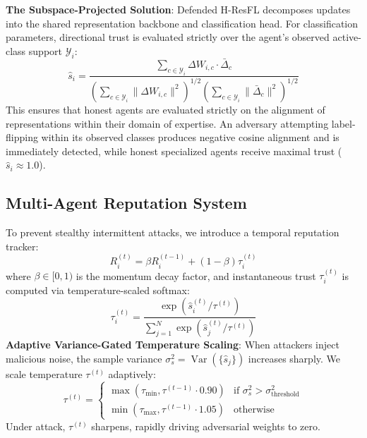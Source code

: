 \documentclass[sigconf]{acmart}
\begin{document}
\textbf{The Subspace-Projected Solution}: Defended H-ResFL decomposes updates into the shared representation backbone and classification head. For classification parameters, directional trust is evaluated strictly over the agent's observed active-class support $\mathcal{Y}_i$:
\begin{equation}
\label{eq:skew_calibrated_cosine}
\hat{s}_i = \frac{\sum_{c \in \mathcal{Y}_i} \Delta W_{i, c} \cdot \bar{\Delta}_c}{\left( \sum_{c \in \mathcal{Y}_i} \|\Delta W_{i, c}\|^2 \right)^{1/2} \left( \sum_{c \in \mathcal{Y}_i} \|\bar{\Delta}_c\|^2 \right)^{1/2}}
\end{equation}
This ensures that honest agents are evaluated strictly on the alignment of representations within their domain of expertise. An adversary attempting label-flipping within its observed classes produces negative cosine alignment and is immediately detected, while honest specialized agents receive maximal trust ($\hat{s}_i \approx 1.0$).

\subsection{Multi-Agent Reputation System}
To prevent stealthy intermittent attacks, we introduce a temporal reputation tracker:
\begin{equation}
\label{eq:reputation_update}
R_i^{(t)} = \beta R_i^{(t-1)} + (1 - \beta) \tau_i^{(t)}
\end{equation}
where $\beta \in [0, 1)$ is the momentum decay factor, and instantaneous trust $\tau_i^{(t)}$ is computed via temperature-scaled softmax:
\begin{equation}
\tau_i^{(t)} = \frac{\exp(\hat{s}_i^{(t)} / \tau^{(t)})}{\sum_{j=1}^N \exp(\hat{s}_j^{(t)} / \tau^{(t)})}
\end{equation}
\textbf{Adaptive Variance-Gated Temperature Scaling}: When attackers inject malicious noise, the sample variance $\sigma_s^2 = \operatorname{Var}(\{\hat{s}_j\})$ increases sharply. We scale temperature $\tau^{(t)}$ adaptively:
\begin{equation}
\tau^{(t)} = \begin{cases} 
\max(\tau_{\min}, \tau^{(t-1)} \cdot 0.90) & \text{if } \sigma_s^2 > \sigma_{\text{threshold}}^2 \\
\min(\tau_{\max}, \tau^{(t-1)} \cdot 1.05) & \text{otherwise}
\end{cases}
\end{equation}
Under attack, $\tau^{(t)}$ sharpens, rapidly driving adversarial weights to zero.
\end{document}
